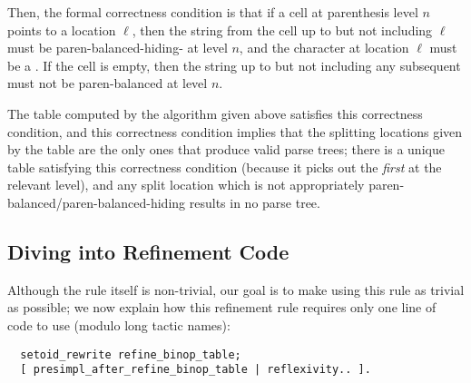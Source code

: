     Then, the formal correctness condition is that if a cell at parenthesis level $n$ points to a location $\ell$, then the string from the cell up to but not including $\ell$ must be paren-balanced-hiding-\terminal{+} at level $n$, and the character at location $\ell$ must be a \terminal{+}.  If the cell is empty, then the string up to but not including any subsequent \terminal{+} must not be paren-balanced at level $n$.
    
    The table computed by the algorithm given above satisfies this correctness condition, and this correctness condition implies that the splitting locations given by the table are the only ones that produce valid parse trees; there is a unique table satisfying this correctness condition (because it picks out the \emph{first} \terminal{+} at the relevant level), and any split location which is not appropriately paren-balanced/paren-balanced-hiding results in no parse tree.  
  
  \subsection{Diving into Refinement Code}
    
    
    Although the rule itself is non-trivial, our goal is to make using this rule as trivial as possible; we now explain how this refinement rule requires only one line of code to use (modulo long tactic names):
\begin{verbatim}
  setoid_rewrite refine_binop_table;
  [ presimpl_after_refine_binop_table | reflexivity.. ].
\end{verbatim}
    
